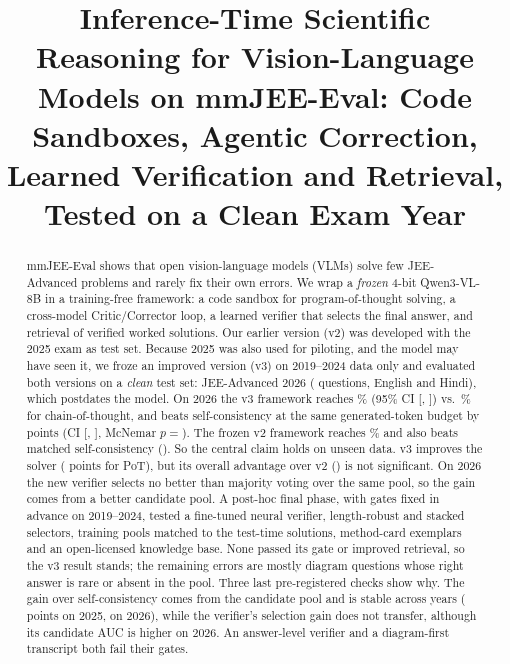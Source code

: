\documentclass[conference]{IEEEtran}
\begin{document}
\title{Inference-Time Scientific Reasoning for Vision-Language Models on mmJEE-Eval:
Code Sandboxes, Agentic Correction, Learned Verification and Retrieval, Tested on a Clean Exam Year}
\author{
}
\maketitle

\begin{abstract}
mmJEE-Eval shows that open vision-language models (VLMs) solve few JEE-Advanced problems and
rarely fix their own errors. We wrap a \emph{frozen} 4-bit Qwen3-VL-8B in a training-free
framework: a code sandbox for program-of-thought solving, a cross-model Critic/Corrector loop, a
learned verifier that selects the final answer, and retrieval of verified worked solutions. Our
earlier version (v2) was developed with the 2025 exam as test set. Because 2025 was also used for
piloting, and the model may have seen it, we froze an improved version (v3) on 2019--2024 data
only and evaluated both versions on a \emph{clean} test set: JEE-Advanced 2026 (\NTest{} questions,
English and Hindi), which postdates the model. On 2026 the v3 framework reaches \ThreeAcc\% (95\%
CI [\ThreeLo, \ThreeHi]) vs.\ \ThreeBase\% for chain-of-thought, and beats self-consistency at
the same generated-token budget by \ThreeVsSc{} points (CI [\ThreeVsScLo, \ThreeVsScHi], McNemar
$p{=}$\ThreeVsScP). The frozen v2 framework reaches \TwoAcc\% and also beats matched
self-consistency (\TwoVsSc{}). So the central claim holds on unseen data. v3 improves the solver
(\PotVsDiff{} points for PoT), but its overall advantage over v2 (\VsDiff) is not significant.
On 2026 the new verifier selects no better than majority voting over the same pool, so the gain
comes from a better candidate pool. A post-hoc final phase, with gates fixed in advance on
2019--2024, tested a fine-tuned neural verifier, length-robust and stacked selectors, training
pools matched to the test-time solutions, method-card exemplars and an open-licensed knowledge
base. None passed its gate or improved retrieval, so the v3 result stands; the remaining errors
are mostly diagram questions whose right answer is rare or absent in the pool. Three last
pre-registered checks show why. The gain over self-consistency comes from the candidate pool and
is stable across years (\VbPoolTwentyFive{} points on 2025, \VbPoolTwentySix{} on 2026), while
the verifier's selection gain does not transfer, although its candidate AUC is higher on 2026.
An answer-level verifier and a diagram-first transcript both fail their gates.
\end{abstract}
\end{document}
